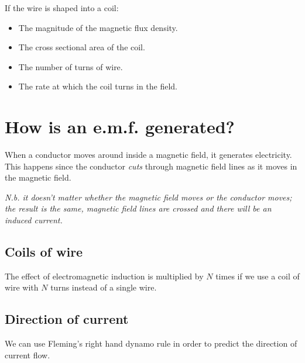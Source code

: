 \documentclass{article}
\begin{document}
If the wire is shaped into a coil:

\begin{itemize}

	\item The magnitude of the magnetic flux density.

	\item The cross sectional area of the coil.

	\item The number of turns of wire.

	\item The rate at which the coil turns in the field.

\end{itemize}

\section*{How is an e.m.f. generated?}

When a conductor moves around inside a magnetic field, it generates electricity.
This happens since the conductor {\it cuts} through magnetic field lines as it
moves in the magnetic field.

{\it N.b. it doesn't matter whether the magnetic field moves or the conductor
moves; the result is the same, magnetic field lines are crossed and there will
be an induced current.}

\subsection*{Coils of wire}

The effect of electromagnetic induction is multiplied by $N$ times if we use a
coil of wire with $N$ turns instead of a single wire.

\subsection*{Direction of current}

We can use Fleming's right hand dynamo rule in order to predict the direction of
current flow.
\end{document}
